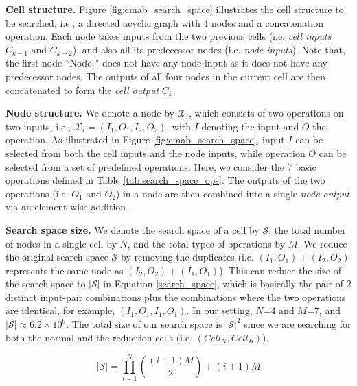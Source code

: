 \documentclass[conference]{IEEEtran}
\def \S  {\mathcal{S}}
\def \X {\mathcal{X}}
\begin{document}
\noindent\textbf{Cell structure.} Figure \ref{fig:cmab_search_space} illustrates the cell structure to be searched, i.e., a directed acyclic graph with 4 nodes and a concatenation operation. Each node takes inputs from the two previous cells (i.e. \emph{cell inputs} $C_{k-1}$ and $C_{k-2}$), and also all its predecessor nodes (i.e. \emph{node inputs}). Note that, the first node ``Node$_1$" does not have any node input as it does not have any predecessor nodes. The outputs of all four nodes in the current cell are then concatenated to form the \emph{cell output} $C_{k}$.

\noindent\textbf{Node structure.} We denote a node by $\X_i$, which consists of two operations on two inputs, i.e., $\X_i=(I_1, O_1, I_2, O_2)$, with $I$ denoting the input and $O$ the operation.
As illustrated in Figure \ref{fig:cmab_search_space}, input $I$ can be selected from both the cell inputs and the node inputs, while operation $O$ can be selected from a set of predefined operations. 
Here, we consider the 7 basic operations defined in Table \ref{tab:search_space_ops}. 
The outputs of the two operations (i.e. $O_1$ and $O_2$) in a node are then combined into a single \emph{node output} via an element-wise addition.

\noindent\textbf{Search space size.} We denote the search space of a cell by $\S$, the total number of nodes in a single cell by $N$, and the total types of operations by $M$. We reduce the original search space $\S$ by removing the duplicates (i.e. $(I_1, O_1)+(I_2, O_2)$ represents the same node as $(I_2, O_2)+(I_1, O_1)$). This can reduce the size of the search space to $|\S|$ in Equation \eqref{search_space}, which is basically the pair of 2 distinct input-pair combinations plus the combinations where the two operations are identical, for example, $(I_1,O_1, I_1,O_1)$. In our setting, $N$=4 and $M$=7, and $|\S| \approx {6.2 \times10^9}$. The total size of our search space is $|\S|^2$ since we are searching for both the normal and the reduction cells (i.e. $(Cell_{N}, Cell_{R})$). 

\begin{equation}
\label{search_space}
|\S|= \prod\limits_{i=1}^{N}{(i+1)M\choose2} + (i+1)M
\end{equation}
\end{document}
